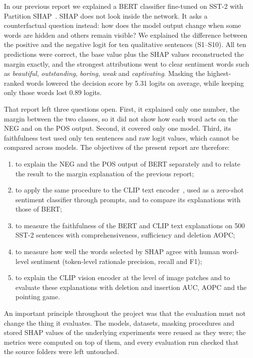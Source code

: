 \documentclass[11pt,a4paper]{article}
\begin{document}
In our previous report we explained a BERT classifier fine-tuned on SST-2 with Partition
SHAP~\cite{lundberg2017}. SHAP does not look inside the network. It asks a counterfactual
question instead: how does the model output change when some words are hidden and others
remain visible? We explained the difference between the positive and the negative logit
for ten qualitative sentences (S1--S10). All ten predictions were correct, the base value
plus the SHAP values reconstructed the margin exactly, and the strongest attributions went
to clear sentiment words such as \emph{beautiful}, \emph{outstanding}, \emph{boring},
\emph{weak} and \emph{captivating}. Masking the highest-ranked words lowered the decision
score by 5.31 logits on average, while keeping only those words lost 0.89 logits.

That report left three questions open. First, it explained only one number, the margin
between the two classes, so it did not show how each word acts on the NEG and on the POS
output. Second, it covered only one model. Third, its faithfulness test used only ten
sentences and raw logit values, which cannot be compared across models. The objectives of
the present report are therefore:

\begin{enumerate}[label=(\arabic*)]
  \item to explain the NEG and the POS output of BERT separately and to relate the result
        to the margin explanation of the previous report;
  \item to apply the same procedure to the CLIP text encoder~\cite{radford2021}, used as a
        zero-shot sentiment classifier through prompts, and to compare its explanations
        with those of BERT;
  \item to measure the faithfulness of the BERT and CLIP text explanations on 500 SST-2
        sentences with comprehensiveness, sufficiency and deletion AOPC;
  \item to measure how well the words selected by SHAP agree with human word-level
        sentiment (token-level rationale precision, recall and F1);
  \item to explain the CLIP vision encoder at the level of image patches and to evaluate
        these explanations with deletion and insertion AUC, AOPC and the pointing game.
\end{enumerate}

An important principle throughout the project was that the evaluation must not change
the thing it evaluates. The models, datasets, masking procedures and stored SHAP values
of the underlying experiments were reused as they were; the metrics were computed on top
of them, and every evaluation run checked that the source folders were left untouched.
\end{document}
